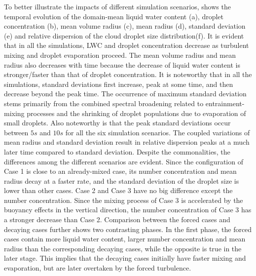 \documentclass[draft,jgrga]{AGUTeX}
\begin{document}
\begin{article}
To better illustrate the impacts of different simulation scenarios,  shows the temporal evolution of the domain-mean liquid water content (a), droplet concentration (b), 
mean volume radius (c), mean radius (d), standard deviation (e) and relative dispersion of the cloud droplet size distribution(f). It is evident that in all the simulations, LWC and droplet concentration decrease as turbulent mixing and droplet evaporation proceed. The mean volume radius and mean radius also decreases with time because the decrease of liquid water content is stronger/faster than that of droplet concentration. It is noteworthy that in all the simulations, standard deviations first increase, peak at some time, and then decrease beyond the peak time. The occurrence of maximum standard deviation stems primarily from the combined spectral broadening related to entrainment-mixing processes and the shrinking of droplet populations due to evaporation of small droplets. Also noteworthy is that the peak standard deviations occur between $5s$ and $10s$ for all the six simulation scenarios. The coupled variations of mean radius and standard deviation result in relative dispersion peaks at a much later time compared to standard deviation. Despite the commonalities, the differences among the different scenarios are evident. Since the configuration of Case 1 is close to an already-mixed case, its number concentration and mean radius decay at a faster rate, and the standard deviation of the droplet size is lower than other cases. Case 2 and Case 3 have no big difference except the number concentration. Since the mixing process of Case 3 is accelerated by the buoyancy effects in the vertical direction, the number concentration of Case 3 has a stronger decrease than Case 2. Comparison between the forced cases and decaying cases further shows two contrasting phases. In the first phase, the forced cases contain more liquid water content, larger number concentration and mean radius than the corresponding decaying cases, while the opposite is true in the later stage. This implies that the decaying cases initially have faster mixing and evaporation, but are later overtaken by the forced turbulence. 
  

\end{article}
\end{document}

